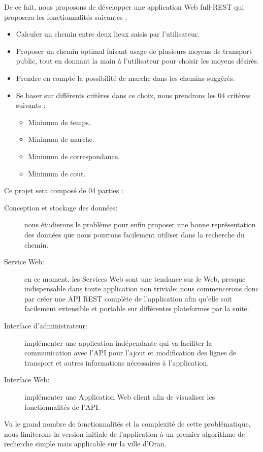De ce fait, nous proposons de développer une application Web full-REST qui proposera les fonctionnalités suivantes : 

\begin{itemize}
	\item Calculer un chemin entre deux lieux saisis par l'utilisateur.
	\item Proposer un chemin optimal faisant usage de plusieurs moyens de transport public, tout en donnant la main à l'utilisateur pour choisir les moyens désirés.
	\item Prendre en compte la possibilité de marche dans les chemins suggérés.
	\item Se baser sur différents critères dans ce choix, nous prendrons les 04 critères suivants : 
	\begin{itemize}
		\item Minimum de temps.
		\item Minimum de marche.
		\item Minimum de correspondance.
		\item Minimum de cout.
	\end{itemize}	 
\end{itemize}

Ce projet sera composé de 04 parties :
\begin{description}
	\item[Conception et stockage des données: ] nous étudierons le problème pour enfin proposer une bonne représentation des données que nous pourrons facilement utiliser dans la recherche du chemin.

	\item[Service Web: ] en ce moment, les Services Web sont une tendance sur le Web, presque indispensable dans toute application non triviale: nous commencerons donc par créer une API REST complète de l'application afin qu'elle soit facilement extensible et portable sur différentes plateformes par la suite.
	
	\item[Interface d'administrateur: ] implémenter une application indépendante qui va faciliter la  communication avec l'API pour l'ajout et modification des lignes de transport et autres informations nécessaires à l'application.
	
	
	\item[Interface Web: ] implémenter une Application Web client afin de visualiser les fonctionnalités de l'API.
\end{description}

Vu le grand nombre de fonctionnalités et la complexité de cette problématique, nous limiterons la version initiale de l'application à un premier algorithme de recherche simple mais applicable sur la ville d'Oran.


